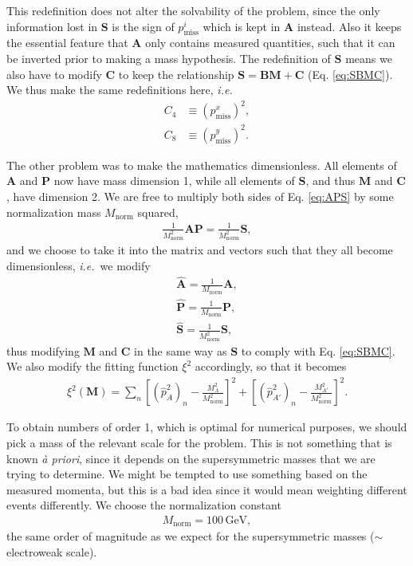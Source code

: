 \documentclass[twoside,english]{uiofysmaster}
\begin{document}
This redefinition does not alter the solvability of the problem, since the only information lost in $\mathbf{S}$ is the sign of $p_\mathrm{miss}^i$ which is kept in $\mathbf{A}$ instead. Also it keeps the essential feature that $\mathbf{A}$ only contains measured quantities, such that it can be inverted prior to making a mass hypothesis. The redefinition of $\mathbf{S}$ means we also have to modify $\mathbf{C}$ to keep the relationship $\mathbf{S} = \mathbf{B} \mathbf{M} + \mathbf{C}$ (Eq. \eqref{eq:SBMC}). We thus make the same redefinitions here, {\it i.e.}
\begin{align}
	C_4 &\equiv (p_\mathrm{miss}^x)^2, \label{eq:Cvec_modified} \\
	C_8 &\equiv (p_\mathrm{miss}^y)^2. \nonumber
\end{align}

The other problem was to make the mathematics dimensionless. All elements of $\mathbf{A}$ and $\mathbf{P}$ now have mass dimension 1, while all elements of $\mathbf{S}$, and thus $\mathbf{M}$ and $\mathbf{C}$, have dimension 2. We are free to multiply both sides of Eq. \eqref{eq:APS} by some normalization mass $M_\mathrm{norm}$ squared,
\begin{align}
	\frac{1}{M_\mathrm{norm}^2} \mathbf{A}\mathbf{P} = \frac{1}{M_\mathrm{norm}^2} \mathbf{S},
\end{align}
and we choose to take it into the matrix and vectors such that they all become dimensionless, {\it i.e.}\ we modify
\begin{align}
	\mathbf{\hat A} = \frac{1}{M_\mathrm{norm}}\mathbf{A},\nonumber \\
	\mathbf{\hat P} = \frac{1}{M_\mathrm{norm}}\mathbf{P},\label{eq:vectors_normalized}\\
	\mathbf{\hat S} = \frac{1}{M_\mathrm{norm}^2}\mathbf{S},\nonumber 
\end{align}
thus modifying $\mathbf{M}$ and $\mathbf{C}$ in the same way as $\mathbf{S}$ to comply with Eq. \eqref{eq:SBMC}. We also modify the fitting function $\xi^2$ accordingly, so that it becomes
\begin{align}
	\xi^2(\mathbf{M}) = \sum_n \left[(\hat p_{A}^2)_n - \frac{M_A^2}{M_\mathrm{norm}^2}\right]^2 + \left[(\hat p_{A'}^2)_n - \frac{M_{A'}^2}{M_\mathrm{norm}^2}\right]^2.\label{eq:xisquared_modified}
\end{align}

To obtain numbers of order 1, which is optimal for numerical purposes, we should pick a mass of the relevant scale for the problem. This is not something that is known {\it \`a priori}, since it depends on the supersymmetric masses that we are trying to determine. We might be tempted to use something based on the measured momenta, but this is a bad idea since it would mean weighting different events differently. We choose the normalization constant
\begin{align}
	M_\mathrm{norm} = 100 \,\mathrm{GeV},
\end{align}
the same order of magnitude as we expect for the supersymmetric masses ($\sim$ electroweak scale). 
\end{document}
